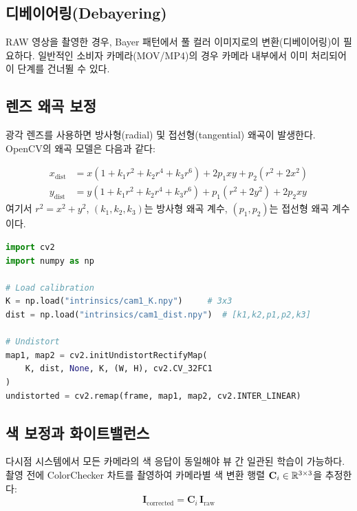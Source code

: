 \documentclass[11pt, a4paper]{report}
\begin{document}
\subsection{디베이어링(Debayering)}

RAW 영상을 촬영한 경우, Bayer 패턴에서 풀 컬러 이미지로의 변환(디베이어링)이 필요하다.
일반적인 소비자 카메라(MOV/MP4)의 경우 카메라 내부에서 이미 처리되어 이 단계를 건너뛸 수 있다.

\subsection{렌즈 왜곡 보정}

광각 렌즈를 사용하면 방사형(radial) 및 접선형(tangential) 왜곡이 발생한다.
OpenCV의 왜곡 모델은 다음과 같다:

\begin{equation}
\begin{aligned}
  x_{\text{dist}} &= x(1 + k_1 r^2 + k_2 r^4 + k_3 r^6) + 2p_1 xy + p_2(r^2 + 2x^2) \\
  y_{\text{dist}} &= y(1 + k_1 r^2 + k_2 r^4 + k_3 r^6) + p_1(r^2 + 2y^2) + 2p_2 xy
\end{aligned}
\end{equation}
여기서 $r^2 = x^2 + y^2$, $(k_1, k_2, k_3)$는 방사형 왜곡 계수,
$(p_1, p_2)$는 접선형 왜곡 계수이다.

\begin{codebox}[title={OpenCV 왜곡 보정}]
\begin{lstlisting}[language=Python]
import cv2
import numpy as np

# Load calibration
K = np.load("intrinsics/cam1_K.npy")     # 3x3
dist = np.load("intrinsics/cam1_dist.npy")  # [k1,k2,p1,p2,k3]

# Undistort
map1, map2 = cv2.initUndistortRectifyMap(
    K, dist, None, K, (W, H), cv2.CV_32FC1
)
undistorted = cv2.remap(frame, map1, map2, cv2.INTER_LINEAR)
\end{lstlisting}
\end{codebox}

\subsection{색 보정과 화이트밸런스}

다시점 시스템에서 모든 카메라의 색 응답이 동일해야 뷰 간 일관된 학습이 가능하다.
촬영 전에 ColorChecker 차트를 촬영하여 카메라별 색 변환 행렬 $\mathbf{C}_i \in \mathbb{R}^{3 \times 3}$을 추정한다:
\begin{equation}
  \mathbf{I}_{\text{corrected}} = \mathbf{C}_i \, \mathbf{I}_{\text{raw}}
\end{equation}
\end{document}
